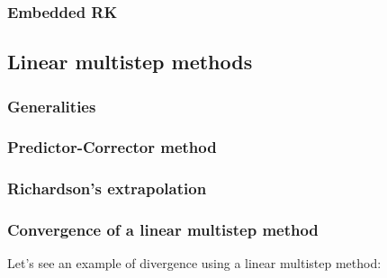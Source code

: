 \subsubsection{Embedded RK}

\newpage
\subsection{Linear multistep methods}
\subsubsection{Generalities}
\subsubsection{Predictor-Corrector method}
\subsubsection{Richardson's extrapolation}
\subsubsection{Convergence of a linear multistep method}

Let's see an example of divergence using a linear multistep method:

